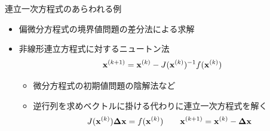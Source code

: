 \begin{frame}[t,fragile]{連立一次方程式のあらわれる例}
  \begin{itemize}
  \item 偏微分方程式の境界値問題の差分法による求解
  \item 非線形連立方程式に対するニュートン法
    \[ {\bf x}^{(k+1)} = {\bf x}^{(k)} - J({\bf x}^{(k)})^{-1} f({\bf x}^{(k)}) \]
    \begin{itemize}
    \item 微分方程式の初期値問題の陰解法など
    \item 逆行列を求めベクトルに掛ける代わりに連立一次方程式を解く
      \[ J({\bf x}^{(k)}){\bf \Delta x}=f({\bf x}^{(k)}) \qquad {\bf x}^{(k+1)}={\bf x}^{(k)}-{\bf \Delta x} \]
    \end{itemize}
  \end{itemize}
\end{frame}
